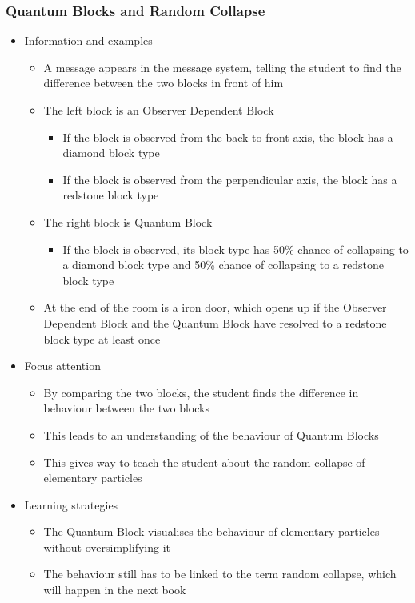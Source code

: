 \documentclass[11pt,twoside]{report} %
\begin{document}
\subsubsection{Quantum Blocks and Random Collapse}
\begin{itemize}
	\item Information and examples
	\begin{itemize}
		\item A message appears in the message system, telling the student to find the difference between the two blocks in front of him
		\item The left block is an Observer Dependent Block
		\begin{itemize}
			\item If the block is observed from the back-to-front axis, the block has a diamond block type
			\item If the block is observed from the perpendicular axis, the block has a redstone block type
		\end{itemize}
		\item The right block is Quantum Block
		\begin{itemize}
			\item If the block is observed, its block type has 50\% chance of collapsing to a diamond block type and 50\% chance of collapsing to a redstone block type
		\end{itemize}
		\item At the end of the room is a iron door, which opens up if the Observer Dependent Block and the Quantum Block have resolved to a redstone block type at least once
	\end{itemize}
	\item Focus attention
	\begin{itemize}
		\item By comparing the two blocks, the student finds the difference in behaviour between the two blocks
		\item This leads to an understanding of the behaviour of Quantum Blocks
		\item This gives way to teach the student about the random collapse of elementary particles
	\end{itemize}
	\item Learning strategies
	\begin{itemize}
		\item The Quantum Block visualises the behaviour of elementary particles without oversimplifying it
		\item The behaviour still has to be linked to the term random collapse, which will happen in the next book

\end{itemize}
\end{itemize}
\end{document}
